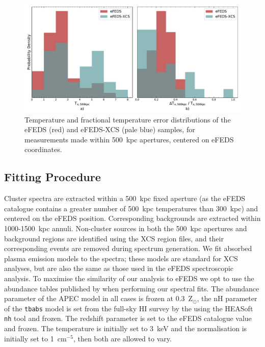 \documentclass[fleqn,usenatbib]{mnras}
\begin{document}
\begin{figure}
    \centering
    \includegraphics[width=1.0\textwidth]{images/efeds_xcs_txcomp.pdf}
    \caption[]{Temperature and fractional temperature error distributions of the eFEDS (red) and eFEDS-XCS (pale blue) samples, for measurements made within 500~kpc apertures, centered on eFEDS coordinates. } 
    \label{fig:efedsxmmtxdist}
\end{figure}

\subsection{Fitting Procedure}
\label{subsec:fitproc}

Cluster spectra are extracted within a 500~kpc fixed aperture (as the eFEDS catalogue contains a greater number of 500~kpc temperatures than 300~kpc) and centered on the eFEDS position.  Corresponding backgrounds are extracted within 1000-1500~kpc annuli. Non-cluster sources in both the 500~kpc apertures and background regions are identified using the XCS region files, and their corresponding events are removed during spectrum generation.  We fit absorbed \cite[with \texttt{tbabs}, ][]{tbabs} plasma emission models \citep[APEC, ][]{apec} to the spectra; these models are standard for XCS analyses, but are also the same as those used in the eFEDS spectroscopic analysis. To maximise the similarity of our analysis to eFEDS we opt to use the abundance tables published by \cite{aspl} when performing our spectral fits. The abundance parameter of the APEC model in all cases is frozen at 0.3~Z$_{\odot}$, the nH parameter of the \texttt{tbabs} model is set from the full-sky HI survey by the \cite{nh} using the HEASoft \texttt{nh} tool and frozen. The redshift parameter is set to the eFEDS catalogue value and frozen. The temperature is initially set to 3~keV and the normalisation is initially set to 1~cm$^{-5}$, then both are allowed to vary.
\end{document}
